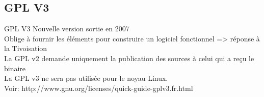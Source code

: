 \subsection{GPL V3}
\begin{frame}{GPL V3}{}
	Nouvelle version sortie en 2007\\
	Oblige à fournir les éléments pour construire un logiciel fonctionnel => réponse à la Tivoisation\\
	La GPL v2 demande uniquement la publication des sources à celui qui a reçu le binaire\\
	La GPL v3 ne sera pas utilisée pour le noyau Linux.\\
	Voir: http://www.gnu.org/licenses/quick-guide-gplv3.fr.html\\
\end{frame}
